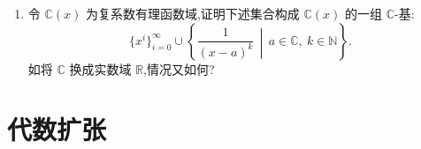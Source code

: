 \begin{enumerate}
\begin{proof}[解答]
    取$\mathbb{C}$在$\mathbb{Q}$上的一组超越基$\{\alpha_i\}_{i \in I}$ (见下一节习题10)，扔掉其中某个元素$\alpha_j$，
    记$\mathbb{B}$为域$\mathbb{Q}(\{\alpha_i\}_{i \in I\setminus\{j\}})$的代数闭包。
    由代数闭包在同构意义下的唯一性 (见命题3.9) 可知$\mathbb{B}$同构于$\mathbb{C}$，
    并且由于$\alpha_j\notin\mathbb{B}$得到$\mathbb{B}$是$\mathbb{C}$的真子域。
\end{proof}

    \item 令 $ \mathbb{C}(x) $ 为复系数有理函数域,证明下述集合构成 $ \mathbb{C}(x) $ 的一组 $ \mathbb{C} $-基:
    \[
    \{ x^i \}_{i=0}^\infty \cup \left\{ \frac{1}{(x-a)^k} \,\middle|\, a \in \mathbb{C},\ k \in \mathbb{N} \right\}.
    \]
    如将 $ \mathbb{C} $ 换成实数域 $ \mathbb{R} $,情况又如何?
\end{enumerate}

\section{代数扩张}

